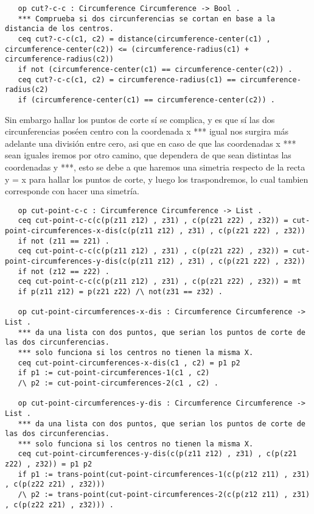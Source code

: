 \begin{verbatim}
   op cut?-c-c : Circumference Circumference -> Bool .
   *** Comprueba si dos circunferencias se cortan en base a la distancia de los centros.
   ceq cut?-c-c(c1, c2) = distance(circumference-center(c1) , circumference-center(c2)) <= (circumference-radius(c1) + circumference-radius(c2))
   if not (circumference-center(c1) == circumference-center(c2)) . 
   ceq cut?-c-c(c1, c2) = circumference-radius(c1) == circumference-radius(c2)
   if (circumference-center(c1) == circumference-center(c2)) .

\end{verbatim}

Sin embargo hallar los puntos de corte s\'i se complica, y es que s\'i las dos circunferencias pos\'een centro con la coordenada x *** igual nos surgira m\'as adelante una divisi\'on entre cero, asi que en caso de que las coordenadas x *** sean iguales iremos por otro camino, que dependera de que sean distintas las coordenadas y ***, esto se debe a que haremos una simetria respecto de la recta y = x para hallar los puntos de corte, y luego los traspondremos, lo cual tambien corresponde con hacer una simetr\'ia. \\

\begin{verbatim}
   op cut-point-c-c : Circumference Circumference -> List .
   ceq cut-point-c-c(c(p(z11 z12) , z31) , c(p(z21 z22) , z32)) = cut-point-circumferences-x-dis(c(p(z11 z12) , z31) , c(p(z21 z22) , z32)) 
   if not (z11 == z21) .
   ceq cut-point-c-c(c(p(z11 z12) , z31) , c(p(z21 z22) , z32)) = cut-point-circumferences-y-dis(c(p(z11 z12) , z31) , c(p(z21 z22) , z32))
   if not (z12 == z22) .
   ceq cut-point-c-c(c(p(z11 z12) , z31) , c(p(z21 z22) , z32)) = mt 
   if p(z11 z12) = p(z21 z22) /\ not(z31 == z32) .

   op cut-point-circumferences-x-dis : Circumference Circumference -> List .
   *** da una lista con dos puntos, que serian los puntos de corte de las dos circunferencias.
   *** solo funciona si los centros no tienen la misma X.
   ceq cut-point-circumferences-x-dis(c1 , c2) = p1 p2
   if p1 := cut-point-circumferences-1(c1 , c2) 
   /\ p2 := cut-point-circumferences-2(c1 , c2) .

   op cut-point-circumferences-y-dis : Circumference Circumference -> List .
   *** da una lista con dos puntos, que serian los puntos de corte de las dos circunferencias.
   *** solo funciona si los centros no tienen la misma X.
   ceq cut-point-circumferences-y-dis(c(p(z11 z12) , z31) , c(p(z21 z22) , z32)) = p1 p2
   if p1 := trans-point(cut-point-circumferences-1(c(p(z12 z11) , z31) , c(p(z22 z21) , z32))) 
   /\ p2 := trans-point(cut-point-circumferences-2(c(p(z12 z11) , z31) , c(p(z22 z21) , z32))) .

\end{verbatim}

